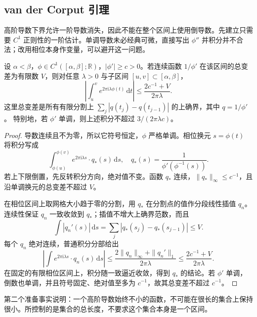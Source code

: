 \subsection{van der Corput 引理}
\label{b2:subsec:210103}

高阶导数下界允许一阶导数消失，因此不能在整个区间上使用倒导数。先建立只需要 \(C^1\) 正则性的一阶估计。单调导数未必经典可微，直接写出 \(\phi''\) 并积分并不合法；改用相位本身作变量，可以避开这一问题。

\begin{lemma}[一阶导数估计]\label{b2:lem:21-monotone-first-derivative}
设 \(\alpha<\beta\)，\(\phi\in C^1([\alpha,\beta];\mathbb R)\)，\(|\phi'|\geq c>0\)。若连续函数 \(1/\phi'\) 在该区间的总变差为有限数 \(V\)，则对任意 \(\lambda>0\) 与子区间 \([u,v]\subset[\alpha,\beta]\)，
\[
 \left|\int_u^v e^{2\pi\mathrm i\lambda\phi(t)}\,\mathrm dt\right|
 \leq\frac{2c^{-1}+V}{2\pi\lambda}.
\]
这里总变差是所有有限分割上
\(\sum_j|q(t_j)-q(t_{j-1})|\) 的上确界，其中 \(q=1/\phi'\)。
特别地，若 \(\phi'\) 单调，则上述积分不超过 \(3/(2\pi\lambda c)\)。
\end{lemma}
\begin{proof}
导数连续且不为零，所以它符号恒定，\(\phi\) 严格单调。相位换元 \(s=\phi(t)\) 将积分写成
\[
 \int_{\phi(u)}^{\phi(v)}
       e^{2\pi\mathrm i\lambda s}\cdot q_*(s)\,\mathrm ds,
 \quad
 q_*(s)=\frac1{\phi'(\phi^{-1}(s))}.
\]
若上下限倒置，先反转积分方向，绝对值不变。函数 \(q_*\) 连续，\(\|q_*\|_\infty\leq c^{-1}\)，且沿单调换元的总变差不超过 \(V\)。

在相位区间上取网格大小趋于零的分割，用 \(q_*\) 在分割点的值作分段线性插值 \(q_n\)。连续性保证 \(q_n\) 一致收敛到 \(q_*\)；插值不增大上确界范数，而且
\[
 \int|q_n'(s)|\,\mathrm ds
 =\sum_j|q_*(s_j)-q_*(s_{j-1})|\leq V.
\]
每个 \(q_n\) 绝对连续，普通积分分部给出
\[
 \left|\int e^{2\pi\mathrm i\lambda s}
                 \cdot q_n(s)\,\mathrm ds\right|
 \leq\frac{2\|q_n\|_\infty+\|q_n'\|_1}{2\pi\lambda}
 \leq\frac{2c^{-1}+V}{2\pi\lambda}.
\]
在固定的有限相位区间上，积分随一致逼近收敛，得到 \(q_*\) 的结论。若 \(\phi'\) 单调，倒数也单调，并且符号固定、绝对值至多为 \(c^{-1}\)，故其总变差不超过 \(c^{-1}\)。
\end{proof}

第二个准备事实说明：一个高阶导数始终不小的函数，不可能在很长的集合上保持很小。所控制的是集合的总长度，不要求这个集合本身是一个区间。

